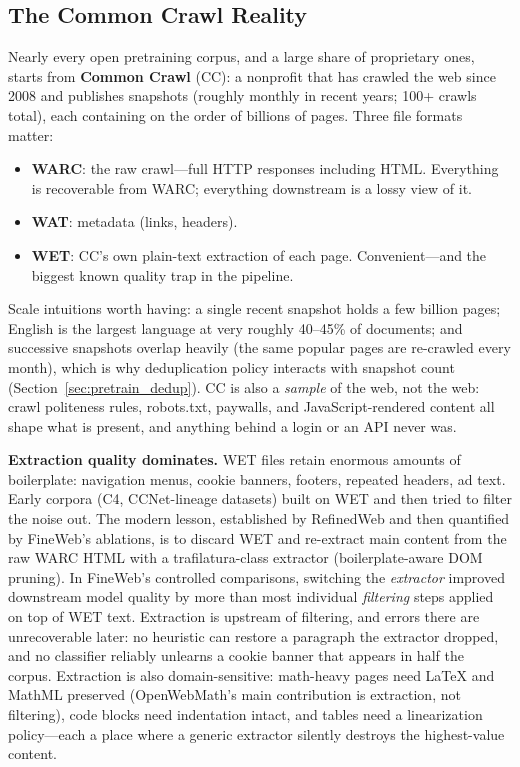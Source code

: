 \subsection{The Common Crawl Reality}

Nearly every open pretraining corpus, and a large share of proprietary ones, starts from \textbf{Common Crawl} (CC): a nonprofit that has crawled the web since 2008 and publishes snapshots (roughly monthly in recent years; 100+ crawls total), each containing on the order of billions of pages. Three file formats matter:

\begin{itemize}
    \item \textbf{WARC}: the raw crawl---full HTTP responses including HTML. Everything is recoverable from WARC; everything downstream is a lossy view of it.
    \item \textbf{WAT}: metadata (links, headers).
    \item \textbf{WET}: CC's own plain-text extraction of each page. Convenient---and the biggest known quality trap in the pipeline.
\end{itemize}

Scale intuitions worth having: a single recent snapshot holds a few billion pages; English is the largest language at very roughly 40--45\% of documents; and successive snapshots overlap heavily (the same popular pages are re-crawled every month), which is why deduplication policy interacts with snapshot count (Section~\ref{sec:pretrain_dedup}). CC is also a \textit{sample} of the web, not the web: crawl politeness rules, robots.txt, paywalls, and JavaScript-rendered content all shape what is present, and anything behind a login or an API never was.

\textbf{Extraction quality dominates.} WET files retain enormous amounts of boilerplate: navigation menus, cookie banners, footers, repeated headers, ad text. Early corpora (C4, CCNet-lineage datasets) built on WET and then tried to filter the noise out. The modern lesson, established by RefinedWeb and then quantified by FineWeb's ablations, is to discard WET and re-extract main content from the raw WARC HTML with a trafilatura-class extractor (boilerplate-aware DOM pruning). In FineWeb's controlled comparisons, switching the \textit{extractor} improved downstream model quality by more than most individual \textit{filtering} steps applied on top of WET text. Extraction is upstream of filtering, and errors there are unrecoverable later: no heuristic can restore a paragraph the extractor dropped, and no classifier reliably unlearns a cookie banner that appears in half the corpus. Extraction is also domain-sensitive: math-heavy pages need LaTeX and MathML preserved (OpenWebMath's main contribution is extraction, not filtering), code blocks need indentation intact, and tables need a linearization policy---each a place where a generic extractor silently destroys the highest-value content.

